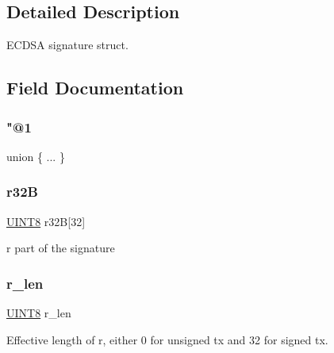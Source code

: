 \subsection{Detailed Description}
E\+C\+D\+SA signature struct. 

\subsection{Field Documentation}
\mbox{\label{struct_t_tx_field_sig_a76096ebc656ff5d7afa9aae3e11a03e4}} 
\subsubsection{\texorpdfstring{"@1}{@1}}
{\footnotesize\ttfamily union \{ ... \} }

\mbox{\label{struct_t_tx_field_sig_acb08684041d47cfe393d93c526cf2b2b}} 
\subsubsection{\texorpdfstring{r32B}{r32B}}
{\footnotesize\ttfamily \mbox{\hyperlink{boattypes_8h_ab27e9918b538ce9d8ca692479b375b6a}{U\+I\+N\+T8}} r32B\mbox{[}32\mbox{]}}



r part of the signature 

\mbox{\label{struct_t_tx_field_sig_ac004600ddcf7a30d14806ef814ee7893}} 
\subsubsection{\texorpdfstring{r\+\_\+len}{r\_len}}
{\footnotesize\ttfamily \mbox{\hyperlink{boattypes_8h_ab27e9918b538ce9d8ca692479b375b6a}{U\+I\+N\+T8}} r\+\_\+len}



Effective length of r, either 0 for unsigned tx and 32 for signed tx. 

\mbox{\label{struct_t_tx_field_sig_a2ca2eee9b55a6b19f664e33950a3c305}} 
